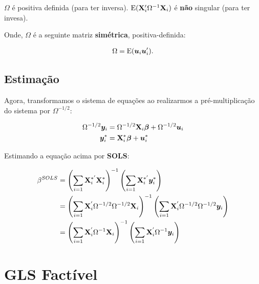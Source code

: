 \documentclass[11pt, oneside, a4paper, article]{article}
\numberwithin{equation}{section}
\begin{document}
\begin{description}
\begin{enumerate}
$\Omega$ é positiva definida (para ter inversa).
$\text{E}(\mathbf{X}_{i}^{\prime} \Omega^{-1} \mathbf{X}_{i})$ é \textbf{não} singular (para ter invesa).

Onde, $\Omega$ é a seguinte matriz \textbf{simétrica}, positiva-definida:

\vspace{-1.5 em}
\begin{align*}
\Omega = \text{E}(\boldsymbol{u}_{i} \boldsymbol{u}_{i}^{\prime}).
\end{align*}
\end{enumerate}

\subsection{Estimação}

Agora, transformamos o sistema de equações ao realizarmos a pré-multiplicação do sistema por $\Omega^{-1/2}$:

\vspace{-1.5 em}
\begin{align*}
\Omega^{-1/2} \boldsymbol{y}_{i} 
&=
\Omega^{-1/2} \mathbf{X}_{i} \boldsymbol{\beta}
+
\Omega^{-1/2} \boldsymbol{u}_{i}
\\
\boldsymbol{y}_{i}^{*}
&=
\mathbf{X}_{i}^{*} \boldsymbol{\beta}
+
\boldsymbol{u}^{*}_{i}
\end{align*}

Estimando a equação acima por \textbf{SOLS}:

\vspace{-1.5 em}
\begin{align*}
\beta^{SOLS}
&=
\left( \sum_{i=1} \mathbf{X}_{i}^{*'} \mathbf{X}_{i}^{*} \right)^{-1}
\left( \sum_{i=1} \mathbf{X}_{i}^{*'} \boldsymbol{y}_{i}^{*} \right)
\\
&=
\left( \sum_{i=1} \mathbf{X}_{i}^{'} \Omega^{-1/2} \Omega^{-1/2} \mathbf{X}_{i} \right)^{-1}
\left( \sum_{i=1} \mathbf{X}_{i}^{'} \Omega^{-1/2} \Omega^{-1/2} \boldsymbol{y}_{i} \right)
\\
&=
\left( \sum_{i=1} \mathbf{X}_{i}^{'} \Omega^{-1} \mathbf{X}_{i} \right)^{-1}
\left( \sum_{i=1} \mathbf{X}_{i}^{'} \Omega^{-1} \boldsymbol{y}_{i} \right)
\end{align*}


\clearpage
\section{GLS Factível}

\noindent
\citet[Sec.7.5 -- Feasible GLS, p.153]{wool-2010} 


\end{description}
\end{document}
